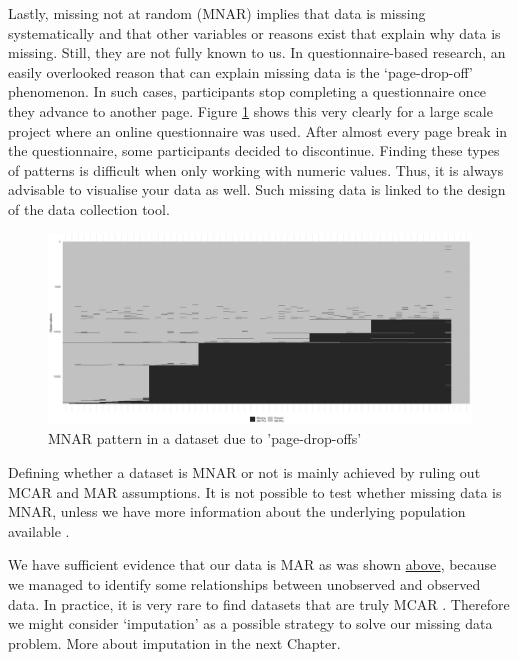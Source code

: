 \documentclass[
]{book}
\begin{document}
Lastly, missing not at random (MNAR) implies that data is missing systematically and that other variables or reasons exist that explain why data is missing. Still, they are not fully known to us. In questionnaire-based research, an easily overlooked reason that can explain missing data is the `page-drop-off' phenomenon. In such cases, participants stop completing a questionnaire once they advance to another page. Figure \ref{fig:mnar-example} shows this very clearly for a large scale project where an online questionnaire was used. After almost every page break in the questionnaire, some participants decided to discontinue. Finding these types of patterns is difficult when only working with numeric values. Thus, it is always advisable to visualise your data as well. Such missing data is linked to the design of the data collection tool.

\begin{figure}

{\centering \includegraphics[width=26.67in]{images/chapter_07_img/03_missing_data/00_mnar_example} 

}

\caption{MNAR pattern in a dataset due to 'page-drop-offs'}\label{fig:mnar-example}
\end{figure}

Defining whether a dataset is MNAR or not is mainly achieved by ruling out MCAR and MAR assumptions. It is not possible to test whether missing data is MNAR, unless we have more information about the underlying population available \citep{van2020rebutting}.

We have sufficient evidence that our data is MAR as was shown \protect\hyperlink{missing-at-random-mar}{above}, because we managed to identify some relationships between unobserved and observed data. In practice, it is very rare to find datasets that are truly MCAR \citep{van-buuren-2018}. Therefore we might consider `imputation' as a possible strategy to solve our missing data problem. More about imputation in the next Chapter.
\end{document}
